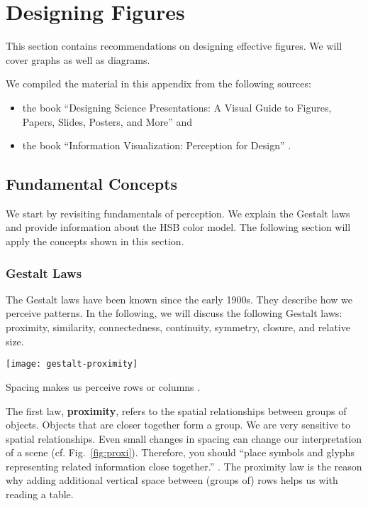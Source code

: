  
\chapter{Designing Figures}

This section contains recommendations on designing effective figures. We will cover graphs as well as diagrams.

We compiled the material in this appendix from the following sources:
\begin{itemize}
  \item the book ``Designing Science Presentations: A Visual Guide to Figures, Papers, Slides, Posters, and More'' \cite{Carter12} and
  \item the book ``Information Visualization: Perception for Design'' \cite{Ware12}. %
\end{itemize}

\section{Fundamental Concepts}

We start by revisiting fundamentals of perception. We explain the Gestalt laws and provide information about the HSB color model. The following section will apply the concepts shown in this section. 

\subsection{Gestalt Laws}

The Gestalt laws have been known since the early 1900s. They describe how we perceive patterns. In the following, we will discuss the following Gestalt laws: proximity, similarity, connectedness, continuity, symmetry, closure, and relative size.

\begin{marginfigure}
\centering
\texttt{[image: gestalt-proximity]}
\caption{\label{fig:proxi} Spacing makes us perceive rows or columns \cite{Ware12}.}%
\end{marginfigure}


The first law, \textbf{proximity}, refers to the spatial relationships between groups of objects. Objects that are closer together form a group. We are very sensitive to spatial relationships. Even small changes in spacing can change our interpretation of a scene (cf. Fig.~\ref{fig:proxi}). Therefore, you should ``place symbols and glyphs representing related information close together.'' 
\cite{Ware12}. The proximity law is the reason why adding additional vertical space between (groups of) rows helps us with reading a table.


